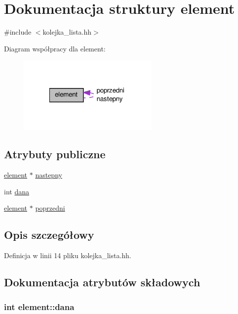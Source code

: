 \hypertarget{structelement}{\section{\-Dokumentacja struktury element}
\label{structelement}
}


{\ttfamily \#include $<$kolejka\-\_\-lista.\-hh$>$}



\-Diagram współpracy dla element\-:\nopagebreak
\begin{figure}[H]
\begin{center}
\leavevmode
\includegraphics[width=194pt]{structelement__coll__graph}
\end{center}
\end{figure}
\subsection*{\-Atrybuty publiczne}
\begin{DoxyCompactItemize}
\item 
\hyperlink{structelement}{element} $\ast$ \hyperlink{structelement_ab6df52b0e5cfa7c4998a2ab74a8ef53e}{nastepny}
\item 
int \hyperlink{structelement_a4e4b66f785b98647b0ecbc85ec23d270}{dana}
\item 
\hyperlink{structelement}{element} $\ast$ \hyperlink{structelement_ab29a484726350416708a843bc30aa4fa}{poprzedni}
\end{DoxyCompactItemize}


\subsection{\-Opis szczegółowy}


\-Definicja w linii 14 pliku kolejka\-\_\-lista.\-hh.



\subsection{\-Dokumentacja atrybutów składowych}
\hypertarget{structelement_a4e4b66f785b98647b0ecbc85ec23d270}{
\subsubsection[{dana}]{\setlength{\rightskip}{0pt plus 5cm}int {\bf element\-::dana}}}\label{structelement_a4e4b66f785b98647b0ecbc85ec23d270}


